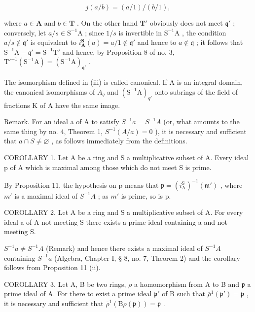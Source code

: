 \begin{enumerate}
\[
j (a / b) = (a / 1) / (b / 1),
\]

where \(a \in \mathbf{A}\) and \(b \in \mathbf{T}\) . On the other hand \(\mathbf{T}'\) obviously does not meet \(\mathfrak{q}'\) ; conversely, let \(a / s \in \mathrm{S}^{-1}\mathrm{A}\) ; since \(1 / s\) is invertible in \(\mathrm{S}^{-1}\mathrm{A}\) , the condition \(a / s \notin \mathfrak{q}'\) is equivalent to \(i_{\mathbf{A}}^{\mathbf{S}}(a) = a / 1 \notin \mathfrak{q}'\) and hence to \(a \notin \mathfrak{q}\) ; it follows that \(\mathrm{S}^{-1}\mathrm{A} - \mathfrak{q}' = \mathrm{S}^{-1}\mathrm{T}'\) and hence, by Proposition 8 of no. 3, \(\mathrm{T}'^{-1}(\mathrm{S}^{-1}\mathrm{A}) = (\mathrm{S}^{-1}\mathrm{A})_{\mathfrak{q}'}\) .

The isomorphism defined in (iii) is called canonical. If A is an integral domain, the canonical isomorphisms of \(A_{q}\) and \((\mathrm{S}^{-1}\mathrm{A})_{q'}\) onto subrings of the field of fractions K of A have the same image.
\end{enumerate}

Remark. For an ideal a of A to satisfy \(S^{-1}a = S^{-1}A\) (or, what amounts to the same thing by no. 4, Theorem 1, \(S^{-1}(A/a) = 0\) ), it is necessary and sufficient that \(a \cap S \neq \varnothing\) , as follows immediately from the definitions.

COROLLARY 1. Let A be a ring and S a multiplicative subset of A. Every ideal p of A which is maximal among those which do not meet S is prime.

By Proposition 11, the hypothesis on p means that \(\mathfrak{p} = (i_{\mathrm{A}}^{\mathrm{S}})^{-1}(\mathfrak{m}')\) , where \(m'\) is a maximal ideal of \(S^{-1}A\) ; as \(m'\) is prime, so is p.

COROLLARY 2. Let A be a ring and S a multiplicative subset of A. For every ideal a of A not meeting S there exists a prime ideal containing a and not meeting S.

\(S^{-1}a \neq S^{-1}A\) (Remark) and hence there exists a maximal ideal of \(S^{-1}A\) containing \(S^{-1}a\) (Algebra, Chapter I, § 8, no. 7, Theorem 2) and the corollary follows from Proposition 11 (ii).

COROLLARY 3. Let A, B be two rings, \(\rho\) a homomorphism from A to B and \(\mathfrak{p}\) a prime ideal of A. For there to exist a prime ideal \(\mathfrak{p}'\) of B such that \(\overline{\rho}^{1}(\mathfrak{p}') = \mathfrak{p}\) , it is necessary and sufficient that \(\overline{\rho}^{1}(\mathrm{B}\rho(\mathfrak{p})) = \mathfrak{p}\) .

